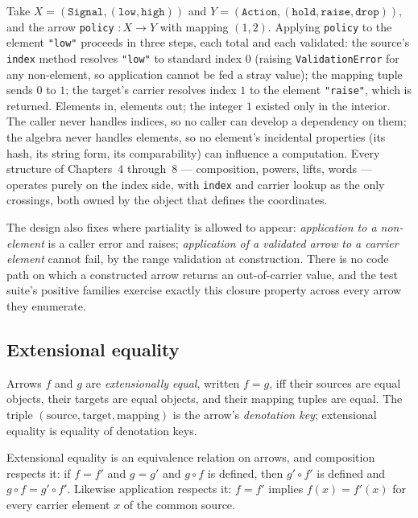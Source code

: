 Take $X = (\texttt{Signal}, (\texttt{low}, \texttt{high}))$ and
$Y = (\texttt{Action}, (\texttt{hold}, \texttt{raise},
\texttt{drop}))$, and the arrow \texttt{policy} $: X \to Y$ with
mapping $(1, 2)$. Applying \texttt{policy} to the element
\texttt{"low"} proceeds in three steps, each total and each validated:
the source's \texttt{index} method resolves \texttt{"low"} to standard
index $0$ (raising \texttt{ValidationError} for any non-element, so
application cannot be fed a stray value); the mapping tuple sends $0$
to $1$; the target's carrier resolves index $1$ to the element
\texttt{"raise"}, which is returned. Elements in, elements out; the
integer $1$ existed only in the interior. The caller never handles
indices, so no caller can develop a dependency on them; the algebra
never handles elements, so no element's incidental properties (its
hash, its string form, its comparability) can influence a computation.
Every structure of Chapters~4 through~8 --- composition, powers, lifts,
words --- operates purely on the index side, with
\texttt{index} and carrier lookup as the only crossings, both owned by
the object that defines the coordinates.

The design also fixes where partiality is allowed to appear:
\emph{application to a non-element} is a caller error and raises;
\emph{application of a validated arrow to a carrier element} cannot
fail, by the range validation at construction. There is no code path
on which a constructed arrow returns an out-of-carrier value, and the
test suite's positive families exercise exactly this closure property
across every arrow they enumerate.

\subsection{Extensional equality}

\begin{definition}\label{ch03:def:ext-eq}
Arrows $f$ and $g$ are \emph{extensionally equal}, written $f = g$, iff
their sources are equal objects, their targets are equal objects, and
their mapping tuples are equal. The triple
$(\mathrm{source}, \mathrm{target}, \mathrm{mapping})$ is the arrow's
\emph{denotation key}; extensional equality is equality of denotation
keys.
\end{definition}

\begin{proposition}\label{ch03:prop:congruence}
Extensional equality is an equivalence relation on arrows, and composition
respects it: if $f = f'$ and $g = g'$ and $g \circ f$ is defined, then
$g' \circ f'$ is defined and $g \circ f = g' \circ f'$. Likewise
application respects it: $f = f'$ implies $f(x) = f'(x)$ for every
carrier element $x$ of the common source.
\end{proposition}

